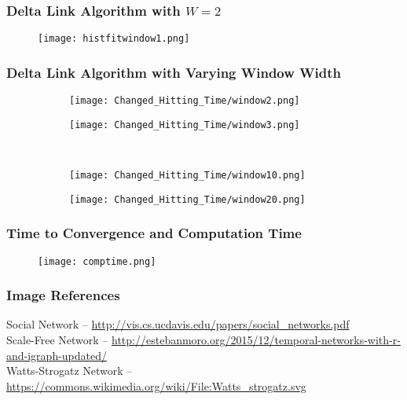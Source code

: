 \documentclass[11pt]{beamer}
\begin{document}
\begin{frame}

\frametitle{Delta Link Algorithm with \(W=2\)}
\begin{figure}
    \centering
    \texttt{[image: histfitwindow1.png]}
\end{figure}
\end{frame}

\begin{frame}
\frametitle{Delta Link Algorithm with Varying Window Width}
\begin{figure}
    \begin{subfigure}{.4\textwidth}
        \centering
        \texttt{[image: Changed\_Hitting\_Time/window2.png]}
        \label{window2nohit}
    \end{subfigure} %
    \begin{subfigure}{.4\textwidth}
        \centering
        \texttt{[image: Changed\_Hitting\_Time/window3.png]}
        \label{window3nohit}
    \end{subfigure}\\%
    \begin{subfigure}{.4\textwidth}
        \centering
        \texttt{[image: Changed\_Hitting\_Time/window10.png]}
        \label{window10nohit}
    \end{subfigure} %
    \begin{subfigure}{.4\textwidth}
        \centering
        \texttt{[image: Changed\_Hitting\_Time/window20.png]}

        \label{window20nohit}
    \end{subfigure} 

\end{figure}
\end{frame}

\begin{frame}

\frametitle{Time to Convergence and Computation Time}
\begin{figure}
    \centering
    \texttt{[image: comptime.png]}
\end{figure}
\end{frame}

\begin{frame}
\frametitle{Image References}
Social Network -- \url{http://vis.cs.ucdavis.edu/papers/social_networks.pdf}\\
Scale-Free Network -- \url{http://estebanmoro.org/2015/12/temporal-networks-with-r-and-igraph-updated/}\\
Watts-Strogatz Network -- \url{https://commons.wikimedia.org/wiki/File:Watts_strogatz.svg}\\
\end{frame}
\end{document}

